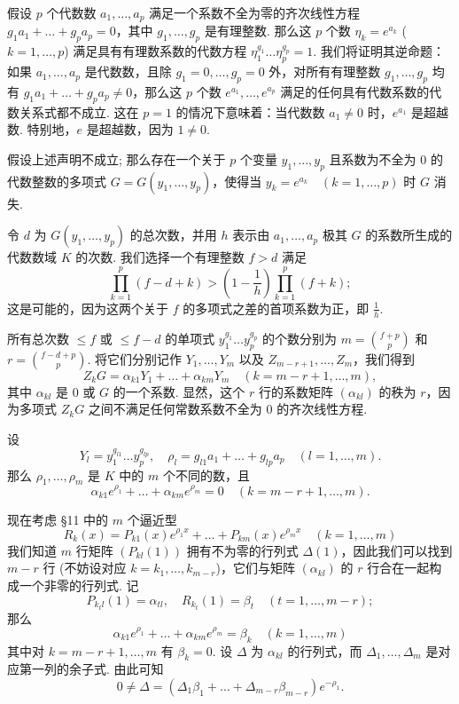 假设 $p$ 个代数数 $a_1, \dots, a_p$ 满足一个系数不全为零的齐次线性方程 $g_1 a_1 + \dots + g_p a_p = 0$，其中 $g_1, \dots, g_p$ 是有理整数. 那么这 $p$ 个数 $\eta_k = e^{a_k}$ ($k=1,\dots,p$) 满足具有有理数系数的代数方程 $\eta_1^{g_1} \dots \eta_p^{g_p} = 1$. 我们将证明其逆命题：如果 $a_1, \dots, a_p$ 是代数数，且除 $g_1=0, \dots, g_p=0$ 外，对所有有理整数 $g_1, \dots, g_p$ 均有 $g_1 a_1 + \dots + g_p a_p \neq 0$，那么这 $p$ 个数 $e^{a_1}, \dots, e^{a_p}$ 满足的任何具有代数系数的代数关系式都不成立. 这在 $p=1$ 的情况下意味着：当代数数 $a_1 \neq 0$ 时，$e^{a_1}$ 是超越数. 特别地，$e$ 是超越数，因为 $1 \neq 0$.

假设上述声明不成立; 那么存在一个关于 $p$ 个变量 $y_1, \dots, y_p$ 且系数为不全为 0 的代数整数的多项式 $G = G(y_1, \dots, y_p)$，使得当 $y_k = e^{a_k} \quad (k=1,\dots,p)$ 时 $G$ 消失.

令 $d$ 为 $G(y_1, \dots, y_p)$ 的总次数，并用 $h$ 表示由 $a_1, \dots, a_p$ 极其 $G$ 的系数所生成的代数数域 $K$ 的次数. 我们选择一个有理整数 $f > d$ 满足
\begin{equation} \prod_{k=1}^{p} (f-d+k) > \left(1-\frac{1}{h}\right) \prod_{k=1}^{p} (f+k); \tag{37}\label{eq:37} \end{equation}
这是可能的，因为这两个关于 $f$ 的多项式之差的首项系数为正，即 $\frac{1}{h}$.

所有总次数 $\leq f$ 或 $\leq f-d$ 的单项式 $y_1^{g_1} \dots y_p^{g_p}$ 的个数分别为 $m = \binom{f+p}{p}$ 和 $r = \binom{f-d+p}{p}$. 将它们分别记作 $Y_1, \dots, Y_m$ 以及 $Z_{m-r+1}, \dots, Z_m$，我们得到
\[ Z_k G = \alpha_{k1} Y_1 + \dots + \alpha_{km} Y_m \quad (k=m-r+1,\dots,m), \]
其中 $\alpha_{kl}$ 是 0 或 $G$ 的一个系数. 显然，这个 $r$ 行的系数矩阵 $(\alpha_{kl})$ 的秩为 $r$，因为多项式 $Z_k G$ 之间不满足任何常数系数不全为 0 的齐次线性方程.

设
\[ Y_l = y_1^{g_{l1}} \dots y_p^{g_{lp}}, \quad \rho_l = g_{l1} a_1 + \dots + g_{lp} a_p \quad (l=1,\dots,m). \]
那么 $\rho_1, \dots, \rho_m$ 是 $K$ 中的 $m$ 个不同的数，且
\[ \alpha_{k1} e^{\rho_1} + \dots + \alpha_{km} e^{\rho_m} = 0 \quad (k=m-r+1,\dots,m). \]

现在考虑 \S 11 中的 $m$ 个逼近型
\[ R_k(x) = P_{k1}(x) e^{\rho_1 x} + \dots + P_{km}(x) e^{\rho_m x} \quad (k=1,\dots,m) \]
我们知道 $m$ 行矩阵 $(P_{kl}(1))$ 拥有不为零的行列式 $\Delta(1)$，因此我们可以找到 $m-r$ 行 (不妨设对应 $k=k_1, \dots, k_{m-r}$)，它们与矩阵 $(\alpha_{kl})$ 的 $r$ 行合在一起构成一个非零的行列式. 记
\[ P_{k_t l}(1) = \alpha_{tl}, \quad R_{k_t}(1) = \beta_t \quad (t=1,\dots,m-r); \]
那么
\[ \alpha_{k1} e^{\rho_1} + \dots + \alpha_{km} e^{\rho_m} = \beta_k \quad (k=1,\dots,m) \]
其中对 $k=m-r+1, \dots, m$ 有 $\beta_k = 0$. 设 $\Delta$ 为 $\alpha_{kl}$ 的行列式，而 $\Delta_1, \dots, \Delta_m$ 是对应第一列的余子式. 由此可知
\begin{equation} 0 \neq \Delta = (\Delta_1 \beta_1 + \dots + \Delta_{m-r} \beta_{m-r}) e^{-\rho_1}. \tag{38}\label{eq:38} \end{equation}

